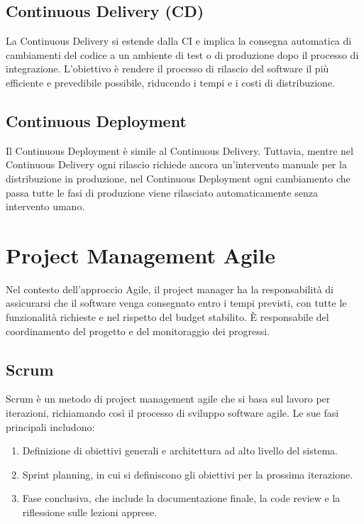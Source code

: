 \subsection{Continuous Delivery (CD)}
La Continuous Delivery si estende dalla CI e implica la consegna automatica di cambiamenti del codice a un ambiente di test o di produzione dopo il
processo di integrazione. L'obiettivo è rendere il processo di rilascio del software il più efficiente e prevedibile possibile, riducendo i tempi
e i costi di distribuzione.

\subsection{Continuous Deployment}
Il Continuous Deployment è simile al Continuous Delivery. Tuttavia, mentre nel Continuous Delivery ogni rilascio richiede ancora un'intervento
manuale per la distribuzione in produzione, nel Continuous Deployment ogni cambiamento che passa tutte le fasi di produzione viene rilasciato
automaticamente senza intervento umano.

\section{Project Management Agile}
Nel contesto dell'approccio Agile, il project manager ha la responsabilità di assicurarsi che il software venga consegnato entro i tempi
previsti, con tutte le funzionalità richieste e nel rispetto del budget stabilito. È responsabile del coordinamento del progetto e del
monitoraggio dei progressi.

\subsection{Scrum}
Scrum è un metodo di project management agile che si basa sul lavoro per iterazioni, richiamando così il processo di sviluppo software agile.
Le sue fasi principali includono:

\begin{enumerate}
    \item Definizione di obiettivi generali e architettura ad alto livello del sistema.
    \item Sprint planning, in cui si definiscono gli obiettivi per la prossima iterazione.
    \item Fase conclusiva, che include la documentazione finale, la code review e la riflessione sulle lezioni apprese.
\end{enumerate}

